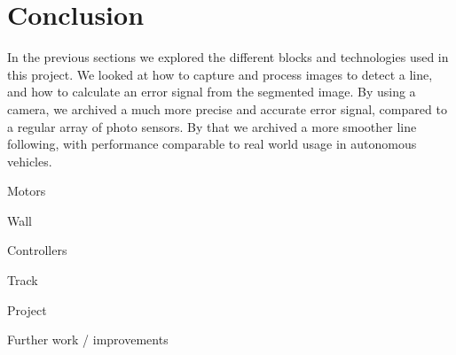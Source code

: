 \chapter{Conclusion}
\label{ch:conclusion}

In the previous sections we explored the different blocks and technologies used in this project. We looked at how to capture and process images to detect a line, and how to calculate an error signal from the segmented image. By using a camera, we archived a much more precise and accurate error signal, compared to a regular array of photo sensors. By that we archived a more smoother line following, with performance comparable to real world usage in autonomous vehicles.

Motors

Wall

Controllers

Track

Project

Further work / improvements